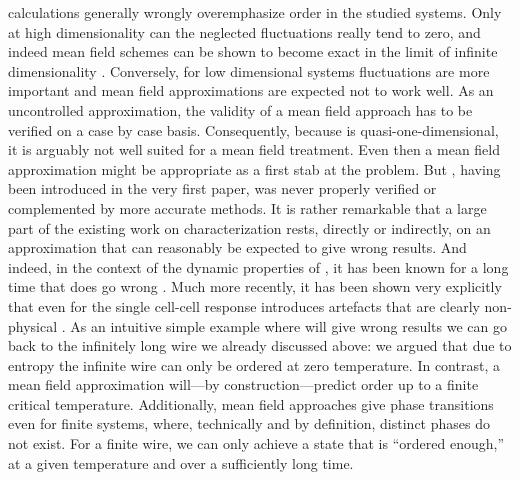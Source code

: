 calculations generally wrongly overemphasize order in the studied systems. Only
at high dimensionality can the neglected fluctuations really tend to zero, and
indeed mean field schemes can be shown to become exact in the limit of infinite
dimensionality \cite{Fehske}. Conversely, for low dimensional systems
fluctuations are more important and mean field approximations are expected not
to work well. As an uncontrolled approximation, the validity of a mean field
approach has to be verified on a case by case basis. Consequently, because
 is quasi-one-dimensional, it is arguably not well suited for a mean
field treatment. Even then a mean field approximation might be appropriate as a
first stab at the problem. But , having been introduced in the very
first  paper, was never properly verified or complemented by more
accurate methods. It is rather remarkable that a large part of the existing work
on  characterization rests, directly or indirectly, on an
approximation that can reasonably be expected to give wrong results. And indeed,
in the context of the dynamic properties of , it has been known for a
long time that  does go wrong \cite{toth2001role}. Much more
recently, it has been shown very explicitly that even for the single cell-cell
response  introduces artefacts that are clearly non-physical
\cite{taucer2012consequences}. As an intuitive simple example where 
will give wrong results we can go back to the infinitely long wire we already
discussed above: we argued that due to entropy the infinite wire can only be
ordered at zero temperature. In contrast, a mean field approximation will---by
construction---predict order up to a finite critical temperature. Additionally,
mean field approaches give phase transitions even for finite systems, where,
technically and by definition, distinct phases do not exist. For a finite wire,
we can only achieve a state that is ``ordered enough,'' at a given temperature
and over a sufficiently long time.

